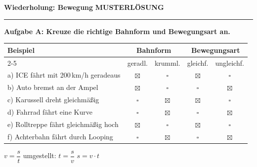 \documentclass[11pt,a4paper]{article}
\newcommand{\aufgabe}[1]{\noindent\textbf{\textcolor{fachfarbe}{#1}}}
\newcommand{\lsg}[1]{\textcolor{loesung}{\textbf{#1}}}
\begin{document}
\noindent
{\Large\bfseries Wiederholung: Bewegung} \hfill \textcolor{loesung}{\Large\textbf{MUSTERLÖSUNG}}
\vspace{0.3em}
\hrule
\vspace{0.6em}

\aufgabe{Aufgabe A: Kreuze die richtige Bahnform und Bewegungsart an.}

\vspace{0.3em}
{\small
\begin{tabular}{|p{5.5cm}|c|c|c|c|}
\hline
\textbf{Beispiel} & \multicolumn{2}{c|}{\textbf{Bahnform}} & \multicolumn{2}{c|}{\textbf{Bewegungsart}} \\
\cline{2-5}
 & geradl. & krumml. & gleichf. & ungleichf. \\
\hline
a) ICE fährt mit 200\,km/h geradeaus & \lsg{$\boxtimes$} & $\square$ & \lsg{$\boxtimes$} & $\square$ \\
\hline
b) Auto bremst an der Ampel & \lsg{$\boxtimes$} & $\square$ & $\square$ & \lsg{$\boxtimes$} \\
\hline
c) Karussell dreht gleichmäßig & $\square$ & \lsg{$\boxtimes$} & \lsg{$\boxtimes$} & $\square$ \\
\hline
d) Fahrrad fährt eine Kurve & $\square$ & \lsg{$\boxtimes$} & $\square$ & \lsg{$\boxtimes$} \\
\hline
e) Rolltreppe fährt gleichmäßig hoch & \lsg{$\boxtimes$} & $\square$ & \lsg{$\boxtimes$} & $\square$ \\
\hline
f) Achterbahn fährt durch Looping & $\square$ & \lsg{$\boxtimes$} & $\square$ & \lsg{$\boxtimes$} \\
\hline
\end{tabular}
}

\vspace{0.6em}

\begin{merkkasten}[title=Formel: Geschwindigkeit]
\begin{center}
{\large $v = \dfrac{s}{t}$} \qquad umgestellt: \quad $t = \dfrac{s}{v}$ \qquad $s = v \cdot t$
\end{center}
\end{merkkasten}
\end{document}
